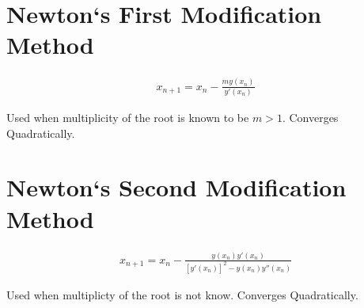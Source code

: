 \section{Newton`s First Modification Method}

	\begin{align}
		x_{n+1} = x_{n} - \frac{my(x_{n})}{y'(x_{n})}
		\label{eq:newtonfirst}
	\end{align}

	Used when multiplicity of the root is known to be $m > 1$. Converges Quadratically.

\section{Newton`s Second Modification Method}

	\begin{align}
		x_{n+1} = x_{n} - \frac{y(x_{n})y'(x_{n})}{\left[y'(x_{n})\right]^{2} - y(x_{n})y''(x_{n})}
		\label{eq:newtonsecond}
	\end{align}

	Used when multiplicty of the root is not know. Converges Quadratically.